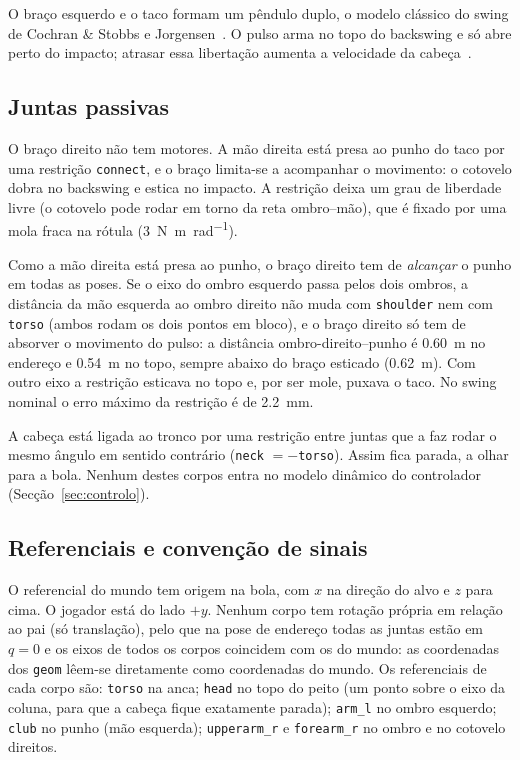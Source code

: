 \documentclass[11pt,a4paper]{article}
\begin{document}
O braço esquerdo e o taco formam um pêndulo duplo, o modelo clássico do swing
de Cochran \& Stobbs e Jorgensen~\cite{cochran1968,jorgensen1970}. O pulso arma
no topo do backswing e só abre perto do impacto; atrasar essa libertação
aumenta a velocidade da cabeça~\cite{pickering1999}.

\subsection{Juntas passivas}
\label{sec:passivas}

O braço direito não tem motores. A mão direita está presa ao punho do taco por
uma restrição \texttt{connect}, e o braço limita-se a acompanhar o movimento:
o cotovelo dobra no backswing e estica no impacto. A restrição deixa um grau de
liberdade livre (o cotovelo pode rodar em torno da reta ombro--mão), que é
fixado por uma mola fraca na rótula (\SI{3}{\newton\meter\per\radian}).

Como a mão direita está presa ao punho, o braço direito tem de \emph{alcançar}
o punho em todas as poses. Se o eixo do ombro esquerdo passa pelos dois ombros,
a distância da mão esquerda ao ombro direito não muda com \texttt{shoulder} nem
com \texttt{torso} (ambos rodam os dois pontos em bloco), e o braço direito só
tem de absorver o movimento do pulso: a distância ombro-direito--punho é
\SI{0.60}{\meter} no endereço e \SI{0.54}{\meter} no topo, sempre abaixo do
braço esticado (\SI{0.62}{\meter}). Com outro eixo a restrição esticava no topo
e, por ser mole, puxava o taco. No swing nominal o erro máximo da restrição é
de \SI{2.2}{\milli\meter}.

A cabeça está ligada ao tronco por uma restrição entre juntas que a faz rodar
o mesmo ângulo em sentido contrário (\texttt{neck} $= -$\texttt{torso}). Assim
fica parada, a olhar para a bola. Nenhum destes corpos entra no modelo
dinâmico do controlador (Secção~\ref{sec:controlo}).

\subsection{Referenciais e convenção de sinais}

O referencial do mundo tem origem na bola, com $x$ na direção do alvo e $z$
para cima. O jogador está do lado $+y$. Nenhum corpo tem rotação própria em
relação ao pai (só translação), pelo que na pose de endereço todas as juntas
estão em $q=0$ e os eixos de todos os corpos coincidem com os do mundo: as
coordenadas dos \texttt{geom} lêem-se diretamente como coordenadas do mundo.
Os referenciais de cada corpo são: \texttt{torso} na anca; \texttt{head} no
topo do peito (um ponto sobre o eixo da coluna, para que a cabeça fique
exatamente parada); \texttt{arm\_l} no ombro esquerdo; \texttt{club} no punho
(mão esquerda); \texttt{upperarm\_r} e \texttt{forearm\_r} no ombro e no
cotovelo direitos.
\end{document}

